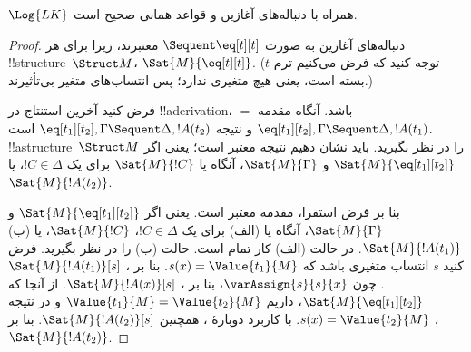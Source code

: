 \documentclass[../../../include/open-logic-section]{subfiles}
\begin{document}


\begin{prop}
$\Log{LK}$ همراه با دنباله‌های آغازین و قواعد همانی صحیح است.
\end{prop}

\begin{proof}
دنباله‌های آغازین به صورت ${} \Sequent \eq[t][t]$ معتبرند، زیرا
برای هر !!{structure}~$\Struct M$، $\Sat{M}{\eq[t][t]}$. (توجه کنید
که فرض می‌کنیم ترم $t$ بسته است، یعنی هیچ متغیری ندارد؛ پس انتساب‌های
متغیر بی‌تأثیرند.)

فرض کنید آخرین استنتاج در !!a{derivation}، $=$ باشد. آنگاه مقدمه
$\eq[t_1][t_2], \Gamma \Sequent \Delta, !A(t_1)$ و نتیجه
$\eq[t_1][t_2], \Gamma \Sequent \Delta, !A(t_2)$ است.
!!a{structure}~$\Struct M$ را در نظر بگیرید. باید نشان دهیم نتیجه
معتبر است؛ یعنی اگر $\Sat{M}{\eq[t_1][t_2]}$ و
$\Sat{M}{\Gamma}$، آنگاه یا $\Sat{M}{!C}$ برای یک
$!C \in \Delta$، یا $\Sat{M}{!A(t_2)}$.

بنا بر فرض استقرا، مقدمه معتبر است. یعنی اگر
$\Sat{M}{\eq[t_1][t_2]}$ و $\Sat{M}{\Gamma}$، آنگاه یا (الف) برای
یک $!C \in \Delta$، $\Sat{M}{!C}$، یا (ب)
$\Sat{M}{!A(t_1)}$. در حالت (الف) کار تمام است. حالت (ب) را در نظر
بگیرید. فرض کنید $s$ انتساب متغیری باشد که
$s(x) = \Value{t_1}{M}$. بنا بر
،
$\Sat{M}{!A(t_1)}[s]$. چون $\varAssign{s}{s}{x}$، بنا بر
،
$\Sat{M}{!A(x)}[s]$. از آنجا که
$\Sat{M}{\eq[t_1][t_2]}$، داریم
$\Value{t_1}{M} = \Value{t_2}{M}$ و در نتیجه
$s(x) = \Value{t_2}{M}$. با کاربرد دوبارهٔ
، همچنین
$\Sat{M}{!A(t_2)}[s]$. بنا بر
،
$\Sat{M}{!A(t_2)}$.
\end{proof}
\end{document}
